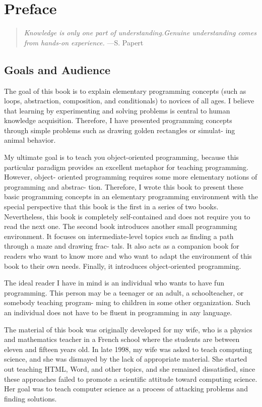 \documentclass[a4paper,10pt,twoside]{book}
\begin{document}
    \sloppy
\fi

\chapter{Preface}\label{cha:preface}

\begin{quote}
\textit{Knowledge is only one part of understanding.Genuine understanding comes 
from hands-on experience.}
—S. Papert 
\end{quote}


\section*{Goals and Audience}
The goal of this book is to explain elementary programming concepts (such as loops, abstraction, 
composition, and conditionals) to novices of all ages. I believe that learning by experimenting 
and solving problems is central to human knowledge acquisition. Therefore, I have presented 
programming concepts through simple problems such as drawing golden rectangles or simulat- 
ing animal behavior. 

My ultimate goal is to teach you object-oriented programming, because this particular 
paradigm provides an excellent metaphor for teaching programming. However, object- 
oriented programming requires some more elementary notions of programming and abstrac- 
tion. Therefore, I wrote this book to present these basic programming concepts in an elementary 
programming environment with the special perspective that this book is the first in a series of 
two books. Nevertheless, this book is completely self-contained and does not require you to 
read the next one. The second book introduces another small programming environment. It 
focuses on intermediate-level topics such as finding a path through a maze and drawing frac- 
tals. It also acts as a companion book for readers who want to know more and who want to 
adapt the environment of this book to their own needs. Finally, it introduces object-oriented 
programming. 

The ideal reader I have in mind is an individual who wants to have fun programming. 
This person may be a teenager or an adult, a schoolteacher, or somebody teaching program- 
ming to children in some other organization. Such an individual does not have to be fluent in 
programming in any language. 

The material of this book was originally developed for my wife, who is a physics and 
mathematics teacher in a French school where the students are between eleven and fifteen 
years old. In late 1998, my wife was asked to teach computing science, and she was dismayed 
by the lack of appropriate material. She started out teaching HTML, Word, and other topics, 
and she remained dissatisfied, since these approaches failed to promote a scientific attitude 
toward computing science. Her goal was to teach computer science as a process of attacking 
problems and finding solutions. 
\end{document}
